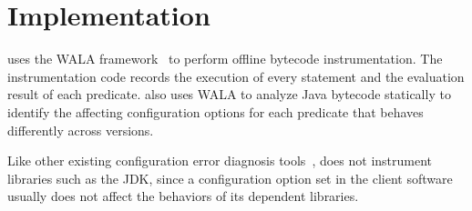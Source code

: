 \section{Implementation}
\label{sec:implementation}

\ourtool uses the WALA framework~\cite{wala} to perform offline
bytecode instrumentation. The instrumentation code
records the execution of every statement and the evaluation
result of each predicate. \ourtool also uses WALA
to analyze Java bytecode statically to
identify the affecting configuration options
for each predicate that behaves differently across versions.

Like other existing configuration error
diagnosis tools~\cite{Rabkin:2011:PPC, Zhang:2013:ADS}, \ourtool
does not instrument libraries such as the JDK,
since a configuration
option set in the client software usually
does not affect the behaviors of its dependent libraries.


